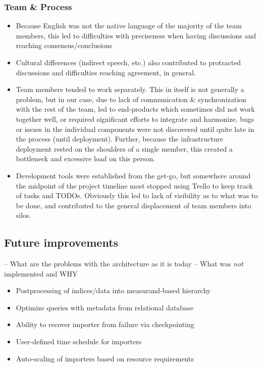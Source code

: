 \subsubsection{Team \& Process}\label{team-process}

\begin{itemize}
\tightlist
\item
  Because English was not the native language of the majority of the
  team members, this led to difficulties with preciseness when having
  discussions and reaching consensus/conclusions
\item
  Cultural differences (indirect speech, etc.) also contributed to
  protracted discussions and difficulties reaching agreement, in
  general.
\item
  Team members tended to work separately. This in itself is not
  generally a problem, but in our case, due to lack of communication \&
  synchronization with the rest of the team, led to end-products which
  sometimes did not work together well, or required significant efforts
  to integrate and harmonize. bugs or issues in the individual
  components were not discovered until quite late in the process (until
  deployment). Further, because the infrastructure deployment rested on
  the shoulders of a single member, this created a bottleneck and
  excessive load on this person.
\item
  Development tools were established from the get-go, but somewhere
  around the midpoint of the project timeline most stopped using Trello
  to keep track of tasks and TODOs. Obviously this led to lack of
  visibility as to what was to be done, and contributed to the general
  displacement of team members into silos.
\end{itemize}

\subsection{Future improvements}\label{future-improvements}

-- What are the problems with the architecture as it is today -- What
was \emph{not} implemented and WHY

\begin{itemize}
\tightlist
\item
  Postprocessing of indices/data into measurand-based hierarchy
\item
  Optimize queries with metadata from relational database
\item
  Ability to recover importer from failure via checkpointing
\item
  User-defined time schedule for importers
\item
  Auto-scaling of importers based on resource requirements
\end{itemize}
